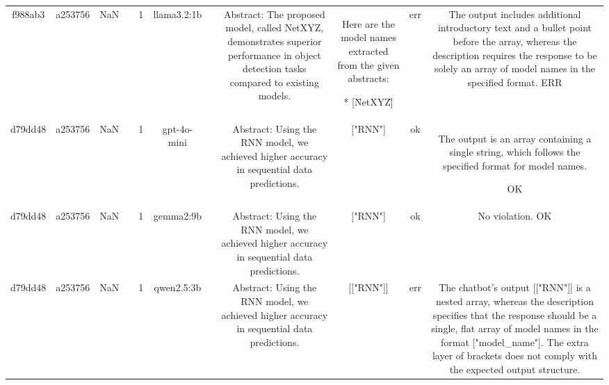 \begin{table}[h!]
\begin{tabular}{|c|c|c|c|c|c|c|c|c|c|c|}
\[\[\[ERR\\
\hline
f988ab3 & a253756 & NaN &  & 1 & llama3.2:1b &  & Abstract: The proposed model, called NetXYZ, demonstrates superior performance in object detection tasks compared to existing models. & Here are the model names extracted from the given abstracts:

* [\"NetXYZ\"] & err & The output includes additional introductory text and a bullet point before the array, whereas the description requires the response to be solely an array of model names in the specified format.
ERR\\
\hline
d79dd48 & a253756 & NaN &  & 1 & gpt-4o-mini &  & Abstract: Using the RNN model, we achieved higher accuracy in sequential data predictions. & ["RNN"] & ok & The output is an array containing a single string, which follows the specified format for model names.

OK\\
\hline
d79dd48 & a253756 & NaN &  & 1 & gemma2:9b &  & Abstract: Using the RNN model, we achieved higher accuracy in sequential data predictions. & ["RNN"] 
 & ok & No violation.
OK\\
\hline
d79dd48 & a253756 & NaN &  & 1 & qwen2.5:3b &  & Abstract: Using the RNN model, we achieved higher accuracy in sequential data predictions. & [["RNN"]] & err & The chatbot's output [["RNN"]] is a nested array, whereas the description specifies that the response should be a single, flat array of model names in the format ["model_name"]. The extra layer of brackets does not comply with the expected output structure.

\]\]\]
\end{tabular}
\end{table}
